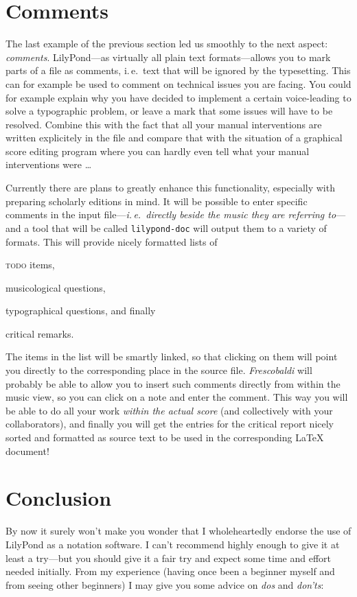 \documentclass[DIV=12]{scrreprt}
\begin{document}
\section{Comments}
\label{sec:pt_lilypond-comments}
The last example of the previous section led us smoothly to the next aspect: \emph{comments}.
LilyPond---as virtually all plain text formats---allows you to mark parts of a file as comments, i.\,e.\ text that will be ignored by the typesetting.
This can for example be used to comment on technical issues you are facing.
You could for example explain why you have decided to implement a certain voice-leading to solve a typographic problem, or leave a mark that some issues will have to be resolved.
Combine this with the fact that all your manual interventions are written explicitely in the file and compare that with the situation of a graphical score editing program where you can hardly even tell what your manual interventions were \dots

Currently there are plans to greatly enhance this functionality, especially with preparing scholarly editions in mind.
It will be possible to enter specific comments in the input file---\emph{i.\,e.\ directly beside the music they are referring to}---and a tool that will be called \texttt{lilypond-doc} will output them to a variety of formats.
This will provide nicely formatted lists of 
\begin{inparaenum}
\item \textsc{todo} items,
\item musicological questions,
\item typographical questions, and finally
\item critical remarks.
\end{inparaenum}
The items in the list will be smartly linked, so that clicking on them will point you directly to the corresponding place in the source file.
\emph{Frescobaldi} will probably be able to allow you to insert such comments directly from within the music view, so you can click on a note and enter the comment.
This way you will be able to do all your work \emph{within the actual score} (and collectively with your collaborators), and finally you will get the entries for the critical report nicely sorted and formatted as source text to be used in the corresponding \LaTeX{} document!

\section{Conclusion}
\label{sec:pt_lilypond-conclusion}
By now it surely won't make you wonder that I wholeheartedly endorse the use of LilyPond as a notation software.
I can't recommend highly enough to give it at least a try---but you should give it a fair try and expect some time and effort needed initially.
From my experience (having once been a beginner myself and from seeing other beginners) I may give you some advice on \emph{dos} and \emph{don'ts}:
\end{document}
